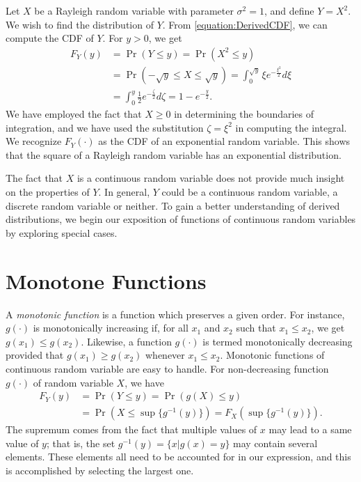 \begin{example}
Let $X$ be a Rayleigh  random variable with parameter $\sigma^2  = 1$, and define $Y = X^2$.
We wish to find the distribution of $Y$.
From \eqref{equation:DerivedCDF}, we can compute the CDF of $Y$.
For $y > 0$, we get
\begin{equation*}
\begin{split}
F_Y(y) &= \Pr (Y \leq y) = \Pr \left( X^2 \leq y \right) \\
&= \Pr (- \sqrt{y} \leq X \leq \sqrt{y})
= \int_0^{\sqrt{y}} \xi e^{- \frac{\xi^2}{2}} d\xi \\
&= \int_0^{y} \frac{1}{2} e^{- \frac{\zeta}{2}} d\zeta
= 1 - e^{-\frac{y}{2}} .
\end{split}
\end{equation*}
We have employed the fact that $X \geq 0$ in determining the boundaries of integration, and we have used the substitution $\zeta = \xi^2$ in computing the integral.
We recognize $F_Y(\cdot)$ as the CDF of an exponential random variable.
This shows that the square of a Rayleigh random variable has an exponential distribution.
\end{example}

The fact that $X$ is a continuous random variable does not provide much insight on the properties of $Y$.
In general, $Y$ could be a continuous random variable, a discrete random variable or neither.
To gain a better understanding of derived distributions, we begin our exposition of functions of continuous random variables by exploring special cases.


\section{Monotone Functions}

A \emph{monotonic function} is a function which preserves a given order.
For instance, $g(\cdot)$ is monotonically increasing if, for all $x_1$ and $x_2$ such that $x_1 \leq x_2$, we get $g(x_1) \leq g(x_2)$.
Likewise, a function $g(\cdot)$ is termed monotonically decreasing provided that $g(x_1) \geq g(x_2)$ whenever $x_1 \leq x_2$.
Monotonic functions of continuous random variable are easy to handle.
For non-decreasing function $g(\cdot)$ of random variable $X$, we have
\begin{equation} \label{equation:MonotoneIncreasingCDF}
\begin{split}
F_Y(y) &= \Pr ( Y \leq y) = \Pr ( g(X) \leq y) \\
&= \Pr \left( X \leq \sup \{ g^{-1} (y) \} \right)
= F_X \left( \sup \{ g^{-1} (y) \} \right) .
\end{split}
\end{equation}
The supremum comes from the fact that multiple values of $x$ may lead to a same value of $y$; that is, the set $g^{-1}(y) = \{ x | g(x) = y \}$ may contain several elements.
These elements all need to be accounted for in our expression, and this is accomplished by selecting the largest one.

